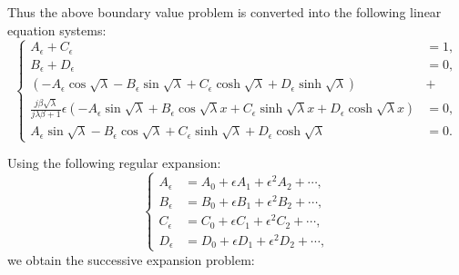 \documentclass{article}
\begin{document}
Thus the above boundary value problem is converted into the following linear equation systems:
\begin{equation}
    \left\{\begin{aligned}
        A_\epsilon + C_\epsilon &= 1, \\
        B_\epsilon + D_\epsilon &= 0, \\
        \left( - A_\epsilon \cos{\sqrt{\lambda}} - B_\epsilon \sin{\sqrt{\lambda}} + C_\epsilon \cosh{\sqrt{\lambda}} + D_\epsilon \sinh{\sqrt{\lambda}} \right) &+ \\
        \frac{j \beta \sqrt{\lambda}}{ j\lambda \beta + 1 } \epsilon \left( - A_\epsilon \sin{\sqrt{\lambda}} + B_\epsilon \cos{\sqrt{\lambda}x} + C_\epsilon \sinh{\sqrt{\lambda}x} + D_\epsilon \cosh{\sqrt{\lambda}x} \right) &= 0, \\
        A_\epsilon \sin{\sqrt{\lambda}} - B_\epsilon \cos{\sqrt{\lambda}} + C_\epsilon \sinh{\sqrt{\lambda}} + D_\epsilon \cosh{\sqrt{\lambda}} &= 0.
    \end{aligned}\right.
\end{equation}

Using the following regular expansion:
\begin{equation}
    \left\{\begin{aligned}
        A_\epsilon &= A_0 + \epsilon A_1 + \epsilon^2 A_2 + \cdots, \\
        B_\epsilon &= B_0 + \epsilon B_1 + \epsilon^2 B_2 + \cdots, \\
        C_\epsilon &= C_0 + \epsilon C_1 + \epsilon^2 C_2 + \cdots, \\
        D_\epsilon &= D_0 + \epsilon D_1 + \epsilon^2 D_2 + \cdots, 
    \end{aligned}\right.
\end{equation}
we obtain the successive expansion problem:
\end{document}
